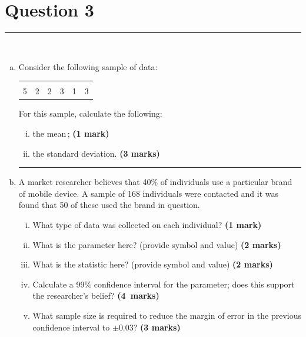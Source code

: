 \documentclass[12pt]{article}
\begin{document}
\section*{Question 3 }
\noindent\rule{\linewidth}{1pt}
\quad\\[-0.5cm]
\begin{enumerate}[a)]
\item Consider the following sample of data:
\begin{center}
\begin{tabular}{|cccccc|}
\hline
&&&&\\[-0.4cm]
5 & 2 & 2 & 3 & 1 & 3
 \\
\hline
\end{tabular}
\end{center}
For this sample, calculate the following:
    \begin{enumerate}[i)]\itemsep0.3cm
    \item the mean\,; \hfill{\scriptsize \bf (1 mark)}
    \item the standard deviation. \hfill{\scriptsize \bf (3 marks)}
    \end{enumerate}
\begin{center}\noindent\rule{0.4\linewidth}{0.5pt}\end{center}
\item A market researcher believes that 40\% of individuals use a particular brand of mobile device. A sample of 168 individuals were contacted and it was found that 50 of these used the brand in question.
    \begin{enumerate}[i)]\itemsep0.3cm
    \item What type of data was collected on each individual? \hfill{\scriptsize \bf (1 mark)}
    \item What is the parameter here? (provide symbol and value) \hfill{\scriptsize \bf (2 marks)}
    \item What is the statistic here? (provide symbol and value) \hfill{\scriptsize \bf (2 marks)}
    \item Calculate a 99\% confidence interval for the parameter; does this support the researcher's belief? \hfill{\mbox{\scriptsize \bf (4 marks)}}
    \item What sample size is required to reduce the margin of error in the previous confidence interval to $\pm0.03$? \hfill{\scriptsize \bf (3 marks)}

\end{enumerate}
\end{enumerate}
\end{document}

